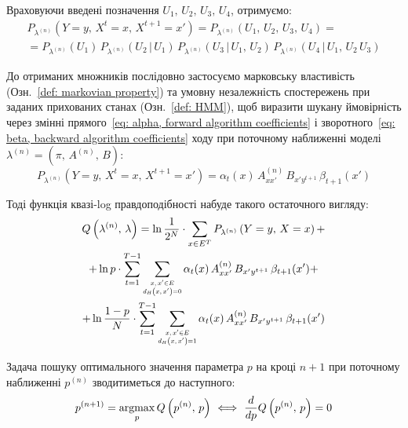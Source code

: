Враховуючи введені позначення $U_1,\,U_2,\,U_3,\,U_4$, отримуємо:
\begin{multline*}
    P_{\lambda^{(n)}} \left( Y=y,\, X^t=x,\, X^{t+1}=x' \right) = P_{\lambda^{(n)}} \left( U_1,\,U_2,\,U_3,\,U_4 \right) = \\ 
    = P_{\lambda^{(n)}} \left( U_1 \right)\, P_{\lambda^{(n)}} \left( U_2 \,|\, U_1 \right)\, P_{\lambda^{(n)}} \left( U_3 \,|\, U_1,\,U_2 \right)\, P_{\lambda^{(n)}} \left( U_4 \,|\, U_1,\,U_2\,U_3 \right)
\end{multline*}

До отриманих множників послідовно застосуємо марковську властивість (Озн.~\ref{def: markovian property}) та умовну незалежність спостережень при заданих прихованих станах (Озн.~\ref*{def: HMM}), щоб виразити шукану ймовірність через змінні прямого~\eqref{eq: alpha, forward algorithm coefficients} і зворотного~\eqref{eq: beta, backward algorithm coefficients} ходу при поточному наближенні моделі $\lambda^{(n)}=(\pi,\,A^{(n)},\,B):$
\begin{equation*}
    P_{\lambda^{(n)}} \left( Y=y,\, X^t=x,\, X^{t+1}=x' \right) = \alpha_t(x)\,A^{(n)}_{xx'}\,B_{x'y^{t+1}}\,\beta_{t+1}(x')
\end{equation*}

Тоді функція квазі-log правдоподібності набуде такого остаточного вигляду:
\begin{multline*}
    Q\left( \lambda^{(n)},\,\lambda \right) = \ln\frac{1}{2^N} \cdot \sum\limits_{x \in E^T} P_{\lambda^{(n)}} \left( Y=y,\, X=x  \right) + \\
    + \ln p \cdot \sum\limits_{t=1}^{T-1} \sum\limits_{\scaleq[0.8]{\substack{x,\,x' \in E \\ d_H\left( x,\,x' \right) = 0}}} \alpha_t(x)\,A^{(n)}_{xx'}\,B_{x'y^{t+1}}\,\beta_{t+1}(x') + \\
    + \ln\frac{1-p}{N} \cdot \sum\limits_{t=1}^{T-1} \sum\limits_{\scaleq[0.8]{\substack{x,\,x' \in E \\ d_H\left( x,\,x' \right) = 1}}} \alpha_t(x)\,A^{(n)}_{xx'}\,B_{x'y^{t+1}}\,\beta_{t+1}(x')
\end{multline*}

Задача пошуку оптимального значення параметра $p$ на кроці $n+1$ при поточному наближенні $p^{(n)}$ зводитиметься до наступного:
\begin{equation*}
    p^{(n+1)} = \argmax\limits_{p} Q\left( p^{(n)},\,p \right)\ \Longleftrightarrow\ \frac{d}{dp} Q\left( p^{(n)},\,p \right) = 0
\end{equation*}

